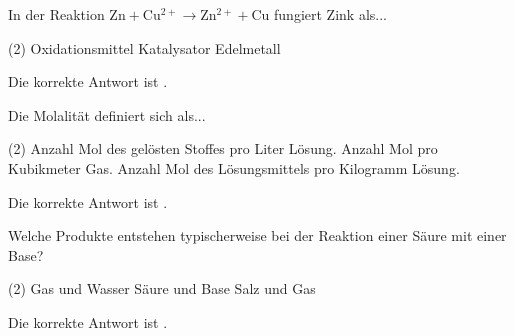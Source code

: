 \begin{exercise}[subtitle=Redoxreaktion, points=0.5, Punkt=0.5]
In der Reaktion \(\mathrm{Zn + Cu^{2+} \rightarrow Zn^{2+} + Cu}\) fungiert Zink als...
\begin{choices}(2)
  \task Oxidationsmittel
  \task {}
  \task Katalysator
  \task Edelmetall
\end{choices}
\begin{solution}
Die korrekte Antwort ist \textbf{}.
\end{solution}
\end{exercise}

\begin{exercise}[subtitle=Begriff der Molalität, points=0.5, Punkt=0.5]
Die Molalität definiert sich als...
\begin{choices}(2)
  \task Anzahl Mol des gelösten Stoffes pro Liter Lösung.
  \task {}
  \task Anzahl Mol pro Kubikmeter Gas.
  \task Anzahl Mol des Lösungsmittels pro Kilogramm Lösung.
\end{choices}
\begin{solution}
Die korrekte Antwort ist \textbf{}.
\end{solution}
\end{exercise}

\begin{exercise}[subtitle=Neutralisationsreaktion, points=0.5, Punkt=0.5]
Welche Produkte entstehen typischerweise bei der Reaktion einer Säure mit einer Base?
\begin{choices}(2)
  \task {}
  \task Gas und Wasser
  \task Säure und Base
  \task Salz und Gas
\end{choices}
\begin{solution}
Die korrekte Antwort ist \textbf{}.
\end{solution}
\end{exercise}
